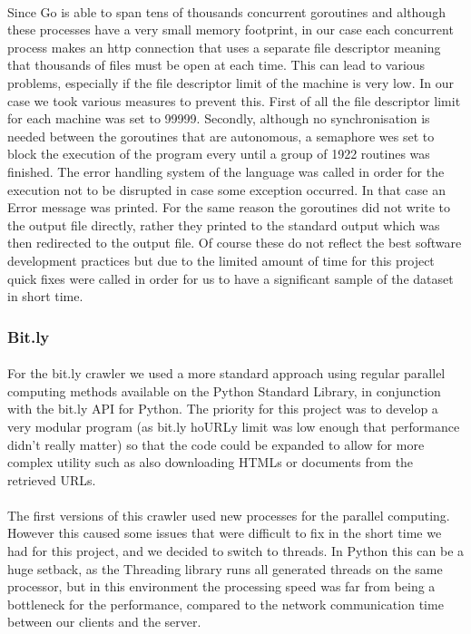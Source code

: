\documentclass[12pt]{article}
\begin{document}
\paragraph{}
Since Go is able to span tens of thousands concurrent goroutines and although these processes have a very small memory footprint, in our case each concurrent process makes an http connection that uses a separate file descriptor meaning that thousands of files must be open at each time. This can lead to various problems, especially if the file descriptor limit of the machine is very low. In our case we took various measures to prevent this. First of all the file descriptor limit for each machine was set to 99999. Secondly, although no synchronisation is needed between the goroutines that are autonomous, a semaphore wes set to block the execution of the program every until a group of 1922 routines was finished. The error handling system of the language was called in order for the execution not to be disrupted in case some exception occurred. In that case an Error message was printed. For the same reason the goroutines did not write to the output file directly, rather they printed to the standard output which was then redirected to the output file. Of course these do not reflect the best software development practices but due to the limited amount of time for this project quick fixes were called in order for us to have a significant sample of the dataset in short time.  


\subsubsection{Bit.ly}

\paragraph{}
For the bit.ly crawler we used a more standard approach using regular parallel computing methods available on the Python Standard Library, in conjunction with the bit.ly API for Python. The priority for this project was to develop a very modular program (as bit.ly hoURLy limit was low enough that performance didn't really matter) so that the code could be expanded to allow for more complex utility such as also downloading HTMLs or documents from the retrieved URLs.

\paragraph{}
The first versions of this crawler used new processes for the parallel computing. However this caused some issues that were difficult to fix in the short time we had for this project, and we decided to switch to threads. In Python this can be a huge setback, as the Threading library runs all generated threads on the same processor, but in this environment the processing speed was far from being a bottleneck for the performance, compared to the network communication time between our clients and the server.
\end{document}
